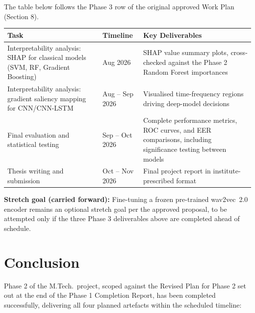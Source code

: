 \documentclass[12pt,a4paper]{report}
\begin{document}
The table below follows the Phase 3 row of the original approved Work Plan (Section 8).

\begin{center}
\begin{tabular}{L{4.5cm}C{2cm}L{6.5cm}}
  \toprule
  \color{white}\textbf{Task} &
  \color{white}\textbf{Timeline} &
  \color{white}\textbf{Key Deliverables} \\
  \midrule
  Interpretability analysis: SHAP for classical models (SVM, RF, Gradient Boosting) &
  Aug 2026 &
  SHAP value summary plots, cross-checked against the Phase 2 Random Forest
  importances \\[4pt]
  Interpretability analysis: gradient saliency mapping for CNN/CNN-LSTM &
  Aug -- Sep 2026 &
  Visualised time-frequency regions driving deep-model decisions \\[4pt]
  Final evaluation and statistical testing &
  Sep -- Oct 2026 &
  Complete performance metrics, ROC curves, and EER comparisons, including
  significance testing between models \\[4pt]
  Thesis writing and submission &
  Oct -- Nov 2026 &
  Final project report in institute-prescribed format \\
  \bottomrule
\end{tabular}
\end{center}

\medskip
\begin{infobox}
  \textbf{Stretch goal (carried forward):} Fine-tuning a frozen pre-trained wav2vec~2.0
  encoder remains an optional stretch goal per the approved proposal, to be attempted only
  if the three Phase 3 deliverables above are completed ahead of schedule.
\end{infobox}

\chapter{Conclusion}

Phase 2 of the M.Tech.\ project, scoped against the Revised Plan for Phase 2 set out at the
end of the Phase 1 Completion Report, has been completed successfully, delivering all four
planned artefacts within the scheduled timeline:
\end{document}
